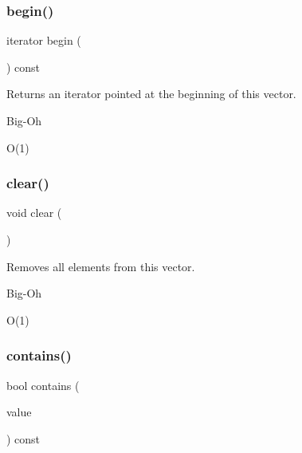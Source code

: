 \subsubsection{\texorpdfstring{begin()}{begin()}}
{\footnotesize\ttfamily iterator begin (\begin{DoxyParamCaption}{ }\end{DoxyParamCaption}) const\hspace{0.3cm}{\ttfamily [inline]}}



Returns an iterator pointed at the beginning of this vector. 

\begin{DoxyRefDesc}{Big-\/\+Oh}
\item[\mbox{\hyperlink{BigOh__BigOh000155}{Big-\/\+Oh}}]O(1) \end{DoxyRefDesc}
\mbox{\label{classVector_ac8bb3912a3ce86b15842e79d0b421204}} 
\subsubsection{\texorpdfstring{clear()}{clear()}}
{\footnotesize\ttfamily void clear (\begin{DoxyParamCaption}{ }\end{DoxyParamCaption})}



Removes all elements from this vector. 

\begin{DoxyRefDesc}{Big-\/\+Oh}
\item[\mbox{\hyperlink{BigOh__BigOh000109}{Big-\/\+Oh}}]O(1) \end{DoxyRefDesc}
\mbox{\label{classVector_a6fbc1a150987e7e5320d244a3baeb560}} 
\subsubsection{\texorpdfstring{contains()}{contains()}}
{\footnotesize\ttfamily bool contains (\begin{DoxyParamCaption}\item[{const Value\+Type \&}]{value }\end{DoxyParamCaption}) const}




